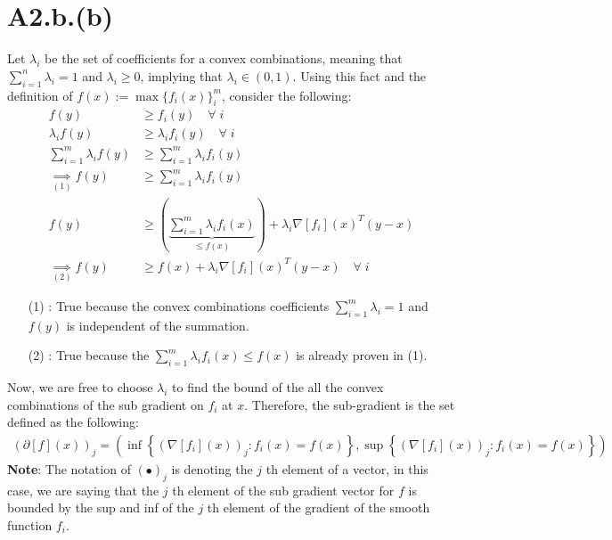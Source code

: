 \documentclass[]{article}
\begin{document}
\section*{A2.b.(b)}
    Let $\lambda_i$ be the set of coefficients for a convex combinations, meaning that $\sum_{i = 1}^{n} \lambda_i = 1$ and $\lambda_i \ge 0$, implying that $\lambda_i \in (0, 1)$. Using this fact and the definition of $f(x):= \max\{f_i(x)\}_i^{m}$, consider the following:
    \begin{align*}\tag{A2.b.b.1}\label{eqn:A2.b.b.1}
        f(y) &\ge f_i(y) \quad \forall\; i
        \\
        \lambda_i f(y) &\ge \lambda_i f_i(y) \quad\forall\; i
        \\
        \sum_{i = 1}^{m}\lambda_i f(y) &\ge 
        \sum_{i = 1}^{m}\lambda_i f_i(y) 
        \\
        \underset{(1)}{\implies} f(y) &\ge \sum_{i = 1}^{m}\lambda_i f_i(y)
        \\
        f(y) &\ge \left(
            \underbrace{\sum_{i = 1}^{m}\lambda_i f_i(x)}_{\le f(x)}
        \right) + \lambda_i \nabla[f_i](x)^T(y - x)
        \\
        \underset{(2)}{\implies} f(y) &\ge f(x) + \lambda_i \nabla[f_i](x)^T(y - x) \quad \forall \; i
    \end{align*}
    \begin{enumerate}
        \item[(1)]: True because the convex combinations coefficients $\sum_{i =1}^m \lambda_i = 1$ and $f(y)$ is independent of the summation. 
        \item[(2)]: True because the $\sum_{i = 1}^{m}\lambda_i f_i(x) \le f(x)$ is already proven in (1).  
    \end{enumerate}
    Now, we are free to choose $\lambda_i$ to find the bound of the all the convex combinations of the sub gradient on $f_i$ at $x$. Therefore, the sub-gradient is the set defined as the following: 
    \begin{align*}\tag{A2.b.b.2}\label{eqn:A2.b.b.2}
        (\partial[f](x))_j = \left(
            \inf\left\lbrace
                (\nabla[f_i](x))_j: f_i(x) = f(x)
            \right\rbrace ,  
            \sup\left\lbrace
                (\nabla[f_i](x))_j: f_i(x) = f(x)
            \right\rbrace
        \right)
    \end{align*}
    \textbf{Note}: The notation of $(\bullet)_j$ is denoting the $j$ th element of a vector, in this case, we are saying that the $j$ th element of the sub gradient vector for $f$ is bounded by the sup and inf of the $j$ th element of the gradient of the smooth function $f_i$. 
\end{document}

